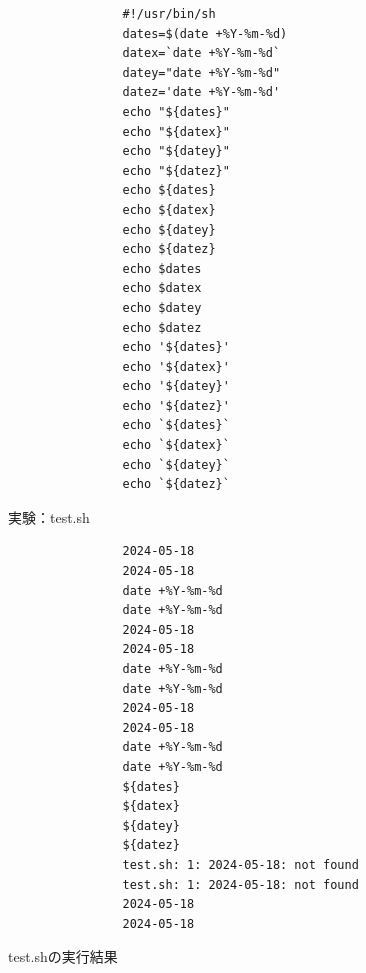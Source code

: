 \documentclass[12pt,a4j]{jsbook}
\begin{document}
\begin{itemize}
	\begin{figure}[htbp]
		\begin{minipage}[b]{0.45\linewidth}
			\centering
			\begin{verbatim}
				#!/usr/bin/sh
				dates=$(date +%Y-%m-%d)
				datex=`date +%Y-%m-%d`
				datey="date +%Y-%m-%d"
				datez='date +%Y-%m-%d'
				echo "${dates}"
				echo "${datex}"
				echo "${datey}"
				echo "${datez}"
				echo ${dates}
				echo ${datex}
				echo ${datey}
				echo ${datez}
				echo $dates
				echo $datex
				echo $datey
				echo $datez
				echo '${dates}'
				echo '${datex}'
				echo '${datey}'
				echo '${datez}'
				echo `${dates}`
				echo `${datex}`
				echo `${datey}`
				echo `${datez}`
			\end{verbatim}
			\caption{実験：test.sh}
		\end{minipage}
		\hspace{1.0cm}
		\begin{minipage}[b]{0.45\linewidth}
			\centering
			\begin{verbatim}
				2024-05-18
				2024-05-18
				date +%Y-%m-%d
				date +%Y-%m-%d
				2024-05-18
				2024-05-18
				date +%Y-%m-%d
				date +%Y-%m-%d
				2024-05-18
				2024-05-18
				date +%Y-%m-%d
				date +%Y-%m-%d
				${dates}
				${datex}
				${datey}
				${datez}
				test.sh: 1: 2024-05-18: not found
				test.sh: 1: 2024-05-18: not found
				2024-05-18
				2024-05-18
			\end{verbatim}
			\caption{test.shの実行結果}
		\end{minipage}
	\end{figure}


\end{itemize}
\end{document}
